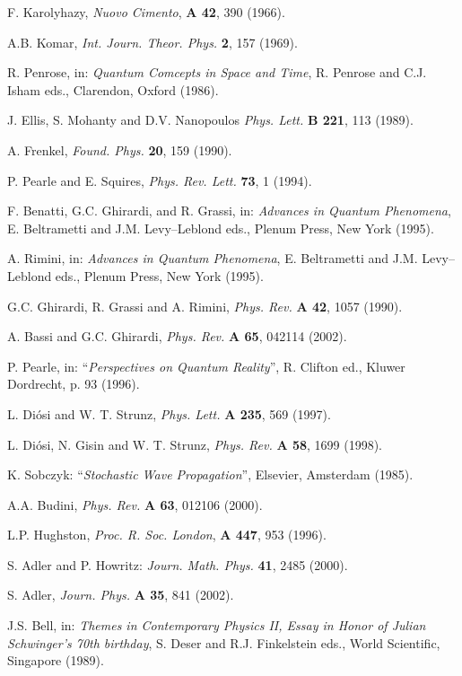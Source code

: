 \documentclass[10pt,a4paper]{article}
\begin{document}
\begin{thebibliography}{999}
 F. Karolyhazy, {\it Nuovo Cimento}, {\bf A 42}, 390
(1966).

 A.B. Komar, {\it Int. Journ. Theor. Phys.} {\bf 2},
157 (1969).

 R. Penrose, in: {\it Quantum Comcepts in Space and
Time}, R. Penrose and C.J. Isham eds., Clarendon, Oxford (1986).

 J. Ellis, S. Mohanty and D.V. Nanopoulos {\it Phys.
Lett.} {\bf B 221}, 113 (1989).

 A. Frenkel, {\it Found. Phys.} {\bf 20}, 159 (1990).

 P. Pearle and E. Squires, {\it Phys. Rev. Lett.}
{\bf 73}, 1 (1994).

 F. Benatti, G.C. Ghirardi, and R. Grassi,
in: {\it Advances in Quantum Phenomena}, E. Beltrametti and J.M.
Levy--Leblond eds., Plenum Press, New York (1995).

 A. Rimini, in: {\it Advances in Quantum Phenomena},
E. Beltrametti and J.M. Levy--Leblond eds., Plenum Press, New York
(1995).

 G.C. Ghirardi, R. Grassi and A. Rimini, {\it Phys.
Rev.} {\bf A 42}, 1057 (1990).

 A. Bassi and G.C. Ghirardi, {\it Phys. Rev.} {\bf
A 65}, 042114 (2002).

 P. Pearle, in: ``{\it Perspectives on Quantum
Reality}'', R. Clifton ed., Kluwer Dordrecht, p. 93 (1996).

 L. Di\'osi and W. T. Strunz, {\it Phys.
Lett.} {\bf A 235}, 569 (1997).

 L. Di\'osi, N. Gisin and W. T. Strunz, {\it Phys.
Rev.} {\bf A 58}, 1699 (1998).

 K. Sobczyk: ``{\it Stochastic Wave Propagation}'',
Elsevier, Amsterdam (1985).

 A.A. Budini, {\it Phys. Rev.} {\bf A 63}, 012106
(2000).

 L.P. Hughston, {\it Proc. R. Soc. London}, {\bf A
447}, 953 (1996).

 S. Adler and P. Howritz: {\it Journ. Math. Phys.}
{\bf 41}, 2485 (2000).

 S. Adler, {\it Journ. Phys.} {\bf A 35}, 841 (2002).

 J.S. Bell, in: {\it Themes in Contemporary
Physics II, Essay in Honor of Julian Schwinger's 70th birthday},
S. Deser and R.J. Finkelstein eds., World Scientific, Singapore
(1989).


\end{thebibliography}
\end{document}
